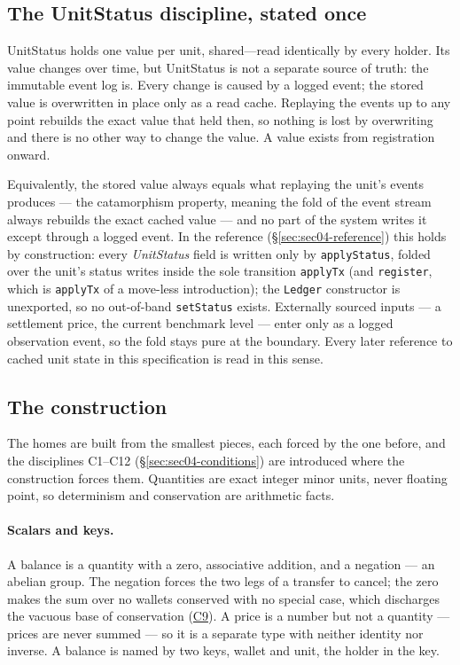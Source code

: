 \subsection{The UnitStatus discipline, stated once}
\label{sec:sec04-unitstatus}

UnitStatus holds one value per unit, shared---read identically by every holder. Its
value changes over time, but UnitStatus is not a separate source of truth: the immutable
event log is. Every change is caused by a logged event; the stored value is overwritten in
place only as a read cache. Replaying the events up to any point rebuilds the exact value
that held then, so nothing is lost by overwriting and there is no other way to change the
value. A value exists from registration onward.

Equivalently, the stored value always equals what replaying the unit's events produces ---
the catamorphism property, meaning the fold of the event stream always rebuilds the exact
cached value --- and no part of the system writes it except through a logged event. In the
reference (\S\ref{sec:sec04-reference}) this holds by construction: every
\emph{UnitStatus} field is written only by \texttt{applyStatus}, folded over the unit's
status writes inside the sole transition \texttt{applyTx} (and \texttt{register}, which is
\texttt{applyTx} of a move-less introduction); the
\texttt{Ledger} constructor is unexported, so no out-of-band \texttt{setStatus} exists.
Externally sourced inputs --- a settlement price, the current benchmark level --- enter
only as a logged observation event, so the fold stays pure at the boundary. Every later
reference to cached unit state in this specification is read in this sense.

\subsection{The construction}
\label{sec:sec04-construction}

The homes are built from the smallest pieces, each forced by the one before, and the
disciplines C1--C12 (\S\ref{sec:sec04-conditions}) are introduced where the construction
forces them. Quantities are exact integer minor units, never floating point, so
determinism and conservation are arithmetic facts.

\paragraph{Scalars and keys.}
A balance is a quantity with a zero, associative addition, and a negation --- an abelian
group. The negation forces the two legs of a transfer to cancel; the zero makes the
sum over no wallets conserved with no special case, which discharges the vacuous base of
conservation (\hyperref[cond:C9]{C9}). A price is a number but not a quantity --- prices
are never summed --- so it is a separate type with neither identity nor inverse. A balance
is named by two keys, wallet and unit, the holder in the key.

